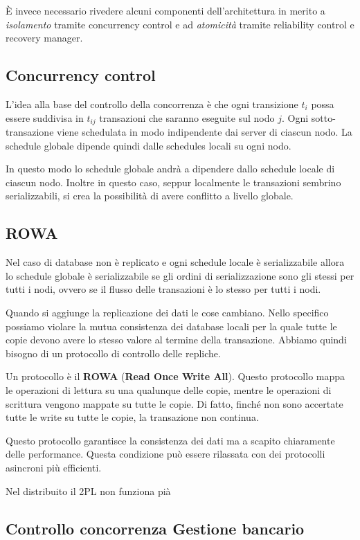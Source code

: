 È invece necessario rivedere alcuni componenti dell'architettura in merito a
\textit{isolamento} tramite concurrency control e ad \textit{atomicità} tramite
reliability control e recovery manager.
\subsection{Concurrency control}
L'idea alla base del controllo della concorrenza è che ogni transizione $t_i$
possa essere suddivisa in $t_{ij}$ transazioni che saranno eseguite sul nodo $j$.
Ogni sotto-transazione viene schedulata in modo indipendente dai server di
ciascun nodo. La schedule globale dipende quindi dalle schedules locali su ogni nodo.

In questo modo lo schedule globale andrà a dipendere dallo schedule locale di
ciascun nodo. Inoltre in questo caso, seppur localmente le transazioni sembrino
serializzabili, si crea la possibilità di avere conflitto a livello globale.
\subsection{ROWA}
Nel caso di database non è replicato e ogni schedule locale è serializzabile 
allora lo schedule globale è serializzabile se gli ordini di serializzazione 
sono gli stessi per tutti i nodi, ovvero se il flusso delle transazioni è lo
stesso per tutti i nodi.

Quando si aggiunge la replicazione dei dati le cose cambiano. Nello specifico 
possiamo violare la mutua consistenza dei database locali per la quale tutte le 
copie devono avere lo stesso valore al termine della transazione. Abbiamo quindi 
bisogno di un protocollo di controllo delle repliche.

Un protocollo è il \textbf{ROWA} (\textbf{Read Once Write All}). Questo 
protocollo mappa le operazioni di lettura su una qualunque delle copie, mentre 
le operazioni di scrittura vengono mappate su tutte le copie. Di fatto, finché 
non sono accertate tutte le write su tutte le copie, la transazione non continua. 

Questo protocollo garantisce la consistenza dei dati ma a scapito chiaramente delle
performance. Questa condizione può essere rilassata con dei protocolli asincroni 
più efficienti.

Nel distribuito il 2PL  non funziona pià





\subsection{Controllo concorrenza Gestione bancario}


